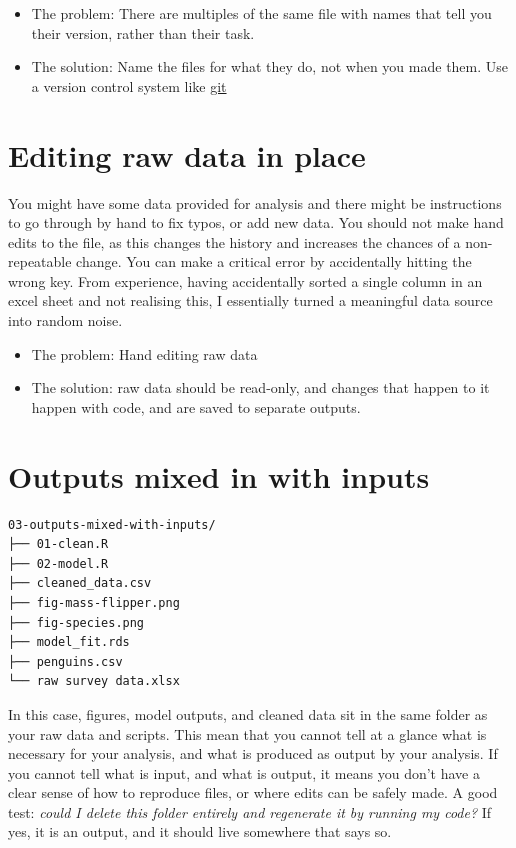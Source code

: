 \documentclass[
  letterpaper,
  justified,
  a4paper]{tufte-book}
\providecommand{\tightlist}{%
  \setlength{\itemsep}{0pt}\setlength{\parskip}{0pt}}
\providecommand{\tightlist}{%
  \setlength{\itemsep}{0pt}\setlength{\parskip}{0pt}}
\begin{document}
\begin{itemize}
\tightlist
\item
  The problem: There are multiples of the same file with names that tell
  you their version, rather than their task.
\item
  The solution: Name the files for what they do, not when you made them.
  Use a version control system like \href{}{git}
\end{itemize}

\section{Editing raw data in place}\label{editing-raw-data-in-place}

You might have some data provided for analysis and there might be
instructions to go through by hand to fix typos, or add new data. You
should not make hand edits to the file, as this changes the history and
increases the chances of a non-repeatable change. You can make a
critical error by accidentally hitting the wrong key. From experience,
having accidentally sorted a single column in an excel sheet and not
realising this, I essentially turned a meaningful data source into
random noise.

\begin{itemize}
\tightlist
\item
  The problem: Hand editing raw data
\item
  The solution: raw data should be read-only, and changes that happen to
  it happen with code, and are saved to separate outputs.
\end{itemize}

\section{Outputs mixed in with
inputs}\label{outputs-mixed-in-with-inputs}

\begin{verbatim}
03-outputs-mixed-with-inputs/
├── 01-clean.R
├── 02-model.R
├── cleaned_data.csv
├── fig-mass-flipper.png
├── fig-species.png
├── model_fit.rds
├── penguins.csv
└── raw survey data.xlsx
\end{verbatim}

In this case, figures, model outputs, and cleaned data sit in the same
folder as your raw data and scripts. This mean that you cannot tell at a
glance what is necessary for your analysis, and what is produced as
output by your analysis. If you cannot tell what is input, and what is
output, it means you don't have a clear sense of how to reproduce files,
or where edits can be safely made. A good test: \emph{could I delete
this folder entirely and regenerate it by running my code?} If yes, it
is an output, and it should live somewhere that says so.
\end{document}

